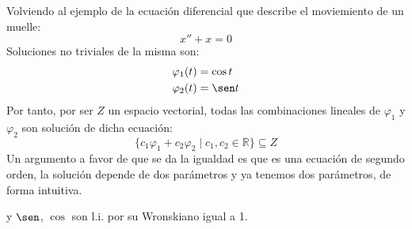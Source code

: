 \begin{ejemplo}
    Volviendo al ejemplo de la ecuación diferencial que describe el moviemiento de un muelle:
    \begin{equation*}
        x'' + x = 0
    \end{equation*}
    Soluciones no triviales de la misma son:
    \begin{align*}
        \varphi_1(t) &= \cos t \\
        \varphi_2(t) &= \sen t 
    \end{align*}
    Por tanto, por ser $Z$ un espacio vectorial, todas las combinaciones lineales de $\varphi_1$ y $\varphi_2$ son solución de dicha ecuación:
    \begin{equation*}
        \{c_1\varphi_1 + c_2\varphi_2 \mid c_1,c_2\in \mathbb{R}\} \subseteq Z
    \end{equation*}
    Un argumento a favor de que se da la igualdad es que es una ecuación de segundo orden, la solución depende de dos parámetros y ya tenemos dos parámetros, de forma intuitiva.


    y $\sen$, $\cos$ son l.i. por su Wronskiano igual a 1.
\end{ejemplo}

